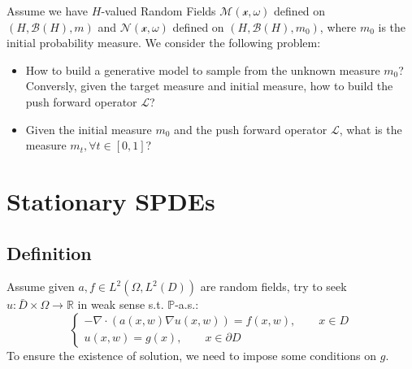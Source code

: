 \begin{definition}
  Assume we have $H$-valued Random Fields $\mathcal{M(x, \omega)}$ defined on $(H, \mathcal{B}(H), m)$ and $\mathcal{N(x, \omega)}$ defined on $(H, \mathcal{B}(H), m_0)$, where $m_0$ is the initial probability measure.
  We consider the following problem: 
  \begin{itemize}
    \item How to build a generative model to sample from the unknown measure $m_0$? 
    Conversly, given the target measure and initial measure, how to build the push forward operator $\mathcal{L}$?
    \item Given the initial measure $m_0$ and the push forward operator $\mathcal{L}$, what is the measure $m_t, \forall t\in [0, 1]$?
  \end{itemize}
\end{definition}

\section{Stationary SPDEs}
\subsection{Definition}
\begin{definition}
    Assume given $a, f\in L^2(\Omega, L^2(D))$ are random fields, try to seek $u:\bar{D}\times \Omega \to \mathbb{R}$ in weak sense s.t. $\mathbb{P}$-a.s.:
    \begin{equation}\left\{
        \begin{aligned}
            -\nabla \cdot (a(x, w)\nabla u(x, w)) = f(x, w),\qquad x\in D\\
            u(x, w) = g(x),\qquad x\in \partial D
        \end{aligned}\right.\label{spde1model}
    \end{equation}
    To ensure the existence of solution, we need to impose some conditions on $g$.
\end{definition}

